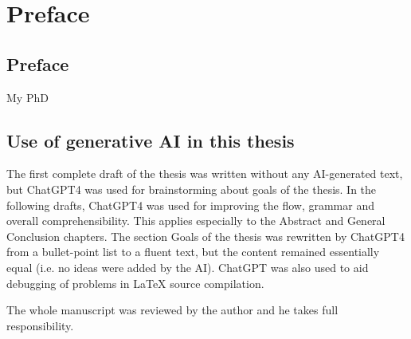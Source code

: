 \chapter*{Preface}                                  \label{ch:preface}
\section*{Preface}
My PhD 

\section*{Use of generative AI in this thesis}
The first complete draft of the thesis was written without any AI-generated text, but ChatGPT4 was used for brainstorming about goals of the thesis. In the following drafts, ChatGPT4 was used for improving the flow, grammar and overall comprehensibility. This applies especially to the Abstract and General Conclusion chapters. The section Goals of the thesis was rewritten by ChatGPT4 from a bullet-point list to a fluent text, but the content remained essentially equal (i.e. no ideas were added by the AI). ChatGPT was also used to aid debugging of problems in LaTeX source compilation.

The whole manuscript was reviewed by the author and he takes full responsibility.

\cleardoublepage

